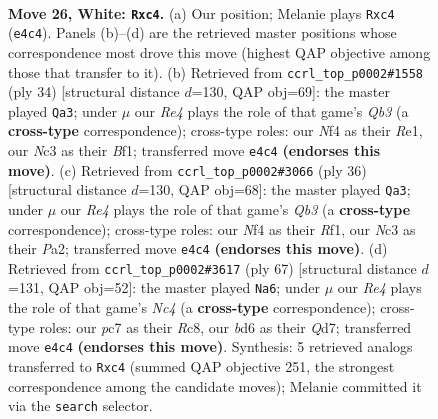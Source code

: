 \documentclass[11pt]{article}
\begin{document}
\clearpage

\begin{figure}[p]\centering
\begin{subfigure}{0.46\textwidth}\centering
\resizebox{\linewidth}{!}{%
\newchessgame
\chessboard[
  setfen={r2q3r/ppp3k1/3b1pp1/3P1b1p/Pnp1RN2/2N3P1/RPP1QP1P/2B3K1 w - - 5 26},
  showmover=false,
  pgfstyle=straightmove, color=movearrow, markmove={e4-c4}
]}
\caption{}
\end{subfigure}\hfill
\begin{subfigure}{0.46\textwidth}\centering
\resizebox{\linewidth}{!}{%
\newchessgame
\chessboard[
  setfen={r3r1k1/pb3pp1/1p1q1b1p/2np4/8/1QN1PN2/PP3PPP/3RRBK1 w - - 0 18},
  showmover=false,
  pgfstyle=straightmove, color=movearrow, markmove={b3-a3}
]}
\caption{}
\end{subfigure}
\\[4pt]
\begin{subfigure}{0.46\textwidth}\centering
\resizebox{\linewidth}{!}{%
\newchessgame
\chessboard[
  setfen={r2qr2k/pb3ppp/1p3b2/2np4/6B1/1QN1PNP1/PP3P1P/3R1RK1 w - - 0 19},
  showmover=false,
  pgfstyle=straightmove, color=movearrow, markmove={b3-a3}
]}
\caption{}
\end{subfigure}\hfill
\begin{subfigure}{0.46\textwidth}\centering
\resizebox{\linewidth}{!}{%
\newchessgame
\chessboard[
  setfen={2r5/1p1qr1bk/1B1p1np1/1NnP1p1p/2P1pP2/1P4P1/2BQR2P/5RK1 b - - 10 34},
  showmover=false,
  pgfstyle=straightmove, color=movearrow, markmove={c5-a6}
]}
\caption{}
\end{subfigure}
\caption{\textbf{Move 26, White: \texttt{Rxc4}.} (a) Our position; Melanie plays \texttt{Rxc4} (\texttt{e4c4}). Panels (b)--(d) are the retrieved master positions whose correspondence most drove this move (highest QAP objective among those that transfer to it). (b) Retrieved from \texttt{ccrl\_top\_p0002\#1558} (ply 34) [structural distance $d$=130, QAP obj=69]: the master played \texttt{Qa3}; under $\mu$ our \emph{Re4} plays the role of that game's \emph{Qb3} (a \textbf{cross-type} correspondence); cross-type roles: our \emph{N}f4 as their \emph{R}e1, our \emph{N}c3 as their \emph{B}f1; transferred move \texttt{e4c4} \textbf{(endorses this move)}. (c) Retrieved from \texttt{ccrl\_top\_p0002\#3066} (ply 36) [structural distance $d$=130, QAP obj=68]: the master played \texttt{Qa3}; under $\mu$ our \emph{Re4} plays the role of that game's \emph{Qb3} (a \textbf{cross-type} correspondence); cross-type roles: our \emph{N}f4 as their \emph{R}f1, our \emph{N}c3 as their \emph{P}a2; transferred move \texttt{e4c4} \textbf{(endorses this move)}. (d) Retrieved from \texttt{ccrl\_top\_p0002\#3617} (ply 67) [structural distance $d$=131, QAP obj=52]: the master played \texttt{Na6}; under $\mu$ our \emph{Re4} plays the role of that game's \emph{Nc4} (a \textbf{cross-type} correspondence); cross-type roles: our \emph{p}c7 as their \emph{R}c8, our \emph{b}d6 as their \emph{Q}d7; transferred move \texttt{e4c4} \textbf{(endorses this move)}. Synthesis: 5 retrieved analogs transferred to \texttt{Rxc4} (summed QAP objective 251, the strongest correspondence among the candidate moves); Melanie committed it via the \texttt{search} selector.}

\end{figure}
\end{document}
